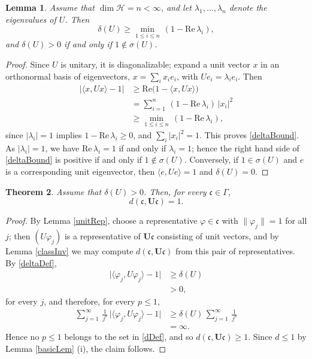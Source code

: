 \documentclass[twoside,11pt,letter]{article}
\def\cH{{\mathcal{H}}}
\def\fc{{\mathfrak{c}}}
\def\re{\mathrm{Re}}
\newtheorem{theorem}{Theorem}[section]
\theoremstyle{definition}
\theoremstyle{definition}
\theoremstyle{plain}
\newtheorem{lemma}[theorem]{Lemma}
\begin{document}
\begin{lemma}\label{specLem}
Assume that $\dim\cH=n<\infty$, and let $\lambda_1,\ldots,\lambda_n$ denote the eigenvalues of $U$. Then
\begin{equation}\label{deltaBound}
\delta(U)\geq\min_{1\leq i\leq n}\,(1-\re\,\lambda_i),
\end{equation}
and $\delta(U)>0$ if and only if $1\notin\sigma(U)$.
\end{lemma}
\begin{proof}
Since $U$ is unitary, it is diagonalizable; expand a unit vector $x$ in an orthonormal basis of eigenvectors, $x=\sum_i x_i e_i$, with $Ue_i=\lambda_i e_i$. Then
\begin{equation*}
\begin{split}
\big|\langle x,Ux\rangle-1\big|&\geq\re\big(1-\langle x,Ux\rangle\big)\\
&=\sum_{i=1}^n\,(1-\re\,\lambda_i)\,|x_i|^2\\
&\geq\min_{1\leq i\leq n}\,(1-\re\,\lambda_i),
\end{split}
\end{equation*}
since $|\lambda_i|=1$ implies $1-\re\,\lambda_i\geq0$, and $\sum_i|x_i|^2=1$. This proves \eqref{deltaBound}. As $|\lambda_i|=1$, we have $\re\,\lambda_i=1$ if and only if $\lambda_i=1$; hence the right hand side of \eqref{deltaBound} is positive if and only if $1\notin\sigma(U)$. Conversely, if $1\in\sigma(U)$ and $e$ is a corresponding unit eigenvector, then $\langle e,Ue\rangle=1$ and $\delta(U)=0$.
\end{proof}

\begin{theorem}\label{unitDistLem}
Assume that $\delta(U)>0$. Then, for every $\fc\in\Gamma$,
\begin{equation}
d(\fc,\mathbf{U}\fc)=1.
\end{equation}
\end{theorem}
\begin{proof}
By Lemma \ref{unitRep}, choose a representative $\varphi\in\fc$ with $\|\varphi_j\|=1$ for all $j$; then $(U\varphi_j)$ is a representative of $\mathbf{U}\fc$ consisting of unit vectors, and by Lemma \ref{classInv} we may compute $d(\fc,\mathbf{U}\fc)$ from this pair of representatives. By \eqref{deltaDef},
\begin{equation*}
\begin{split}
\big|\langle\varphi_j,U\varphi_j\rangle-1\big|&\geq\delta(U)\\
&>0,
\end{split}
\end{equation*}
for every $j$, and therefore, for every $p\leq1$,
\begin{equation*}
\begin{split}
\sum_{j=1}^\infty\,\frac{1}{j^p}\,\big|\langle\varphi_j,U\varphi_j\rangle-1\big|
&\geq\delta(U)\,\sum_{j=1}^\infty\,\frac{1}{j^p}\\
&=\infty.
\end{split}
\end{equation*}
Hence no $p\leq1$ belongs to the set in \eqref{dDef}, and so $d(\fc,\mathbf{U}\fc)\geq1$. Since $d\leq1$ by Lemma \ref{basicLem} (i), the claim follows.
\end{proof}
\end{document}
